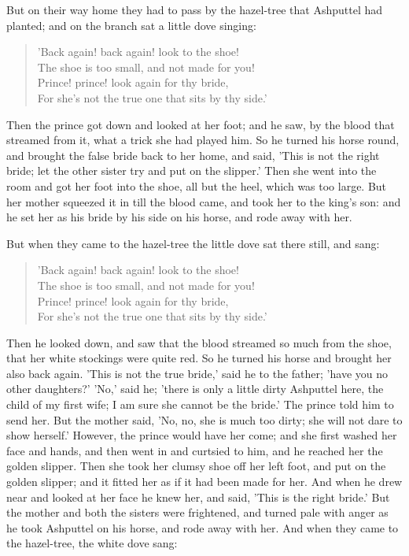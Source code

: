 \documentclass[12pt]{book}
\begin{document}
But on their way home they had to pass by the hazel-tree that
Ashputtel had planted; and on the branch sat a little dove singing:

\begin{verse}
 'Back again! back again! look to the shoe!\\
  The shoe is too small, and not made for you!\\
  Prince! prince! look again for thy bride,\\
  For she's not the true one that sits by thy side.'
\end{verse}

Then the prince got down and looked at her foot; and he saw, by the
blood that streamed from it, what a trick she had played him. So he
turned his horse round, and brought the false bride back to her home,
and said, 'This is not the right bride; let the other sister try and
put on the slipper.' Then she went into the room and got her foot into
the shoe, all but the heel, which was too large. But her mother
squeezed it in till the blood came, and took her to the king's son:
and he set her as his bride by his side on his horse, and rode away
with her.

But when they came to the hazel-tree the little dove sat there still,
and sang:

\begin{verse}
 'Back again! back again! look to the shoe!\\
  The shoe is too small, and not made for you!\\
  Prince! prince! look again for thy bride,\\
  For she's not the true one that sits by thy side.'
\end{verse}

Then he looked down, and saw that the blood streamed so much from the
shoe, that her white stockings were quite red. So he turned his horse
and brought her also back again. 'This is not the true bride,' said he
to the father; 'have you no other daughters?' 'No,' said he; 'there is
only a little dirty Ashputtel here, the child of my first wife; I am
sure she cannot be the bride.' The prince told him to send her. But
the mother said, 'No, no, she is much too dirty; she will not dare to
show herself.' However, the prince would have her come; and she first
washed her face and hands, and then went in and curtsied to him, and
he reached her the golden slipper. Then she took her clumsy shoe off
her left foot, and put on the golden slipper; and it fitted her as if
it had been made for her. And when he drew near and looked at her face
he knew her, and said, 'This is the right bride.' But the mother and
both the sisters were frightened, and turned pale with anger as he
took Ashputtel on his horse, and rode away with her. And when they
came to the hazel-tree, the white dove sang:
\end{document}
